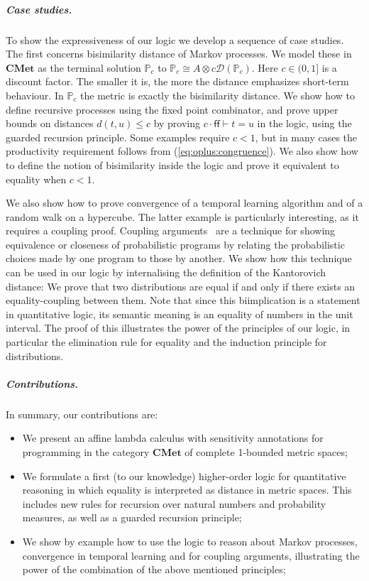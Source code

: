 \documentclass[a4paper,UKenglish,cleveref, autoref, thm-restate]{lipics-v2021}
\newcommand{\cat}[1]{\mathbf{#1}}
\newcommand{\CMet}{\cat{CMet}}
\newcommand{\mprod}{\otimes}
\newcommand{\D}{\mathcal{D}}
\newcommand{\iso}{\cong}
\newcommand{\ts}{\vdash}
\newcommand{\semProc}[1][\discfact]{\mathbb{P}_{#1}}
\newcommand{\semLabels}{A}
\newcommand{\false}{\mathsf{ff}}
\newcommand{\discfact}{c} %
\newcommand{\peq}{=}
\begin{document}
\subparagraph*{Case studies.}

To show the expressiveness of our logic we develop a sequence of case studies. 
The first concerns bisimilarity distance of Markov processes. We model these in $\CMet$ as the terminal
solution $\semProc$ to $\semProc \iso \semLabels\mprod\discfact\D(\semProc)$. Here $\discfact \in (0,1]$ is a 
discount factor. The smaller it is, the more the distance emphasizes short-term behaviour. In $\semProc$ the metric is exactly the bisimilarity distance. We show how to define recursive processes using the %
fixed point combinator, and prove upper bounds on distances  $d(t,u) \leq c$ by proving $c \cdot \false \ts t \peq u$ in the logic,
using the guarded recursion principle. Some examples require $c<1$, but in many cases
the productivity requirement follows from (\ref{eq:oplus:congruence}). We also show how to
define the notion of bisimilarity inside the logic and prove it equivalent to equality when $c<1$. 

We also show how to prove convergence of a temporal learning algorithm and of a random walk on a hypercube. 
The latter example is particularly interesting, as it requires a coupling proof. Coupling arguments~\cite{LindvallBook} are a technique for showing 
equivalence or closeness of probabilistic programs by relating the probabilistic choices made by one program
to those by another. We show how this technique can be used in our logic by internalising the definition of the 
Kantorovich distance: We prove that two distributions are equal if and only if there exists an equality-coupling 
between them. Note that since this biimplication is a statement in quantitative logic, its semantic meaning is an
equality of numbers in the unit interval. The proof of this illustrates the power of the principles of our logic,
in particular the elimination rule for equality and the induction principle for distributions. 


\subparagraph*{Contributions.}
In summary, our contributions are: %
\begin{itemize}[topsep=0ex]
\item We present an affine lambda calculus with sensitivity annotations 
for programming in the category $\CMet$ of complete 1-bounded metric spaces; 
\item We formulate a first (to our knowledge) 
higher-order logic for quantitative reasoning in which equality is interpreted as distance in metric spaces. 
This includes new rules for recursion over natural numbers and probability measures, as well as a guarded 
recursion principle;
\item We show by example how to use the logic to reason about Markov processes, convergence in temporal learning
and for coupling arguments, illustrating the power of the combination of 
the above mentioned principles;
\end{itemize}
\end{document}
